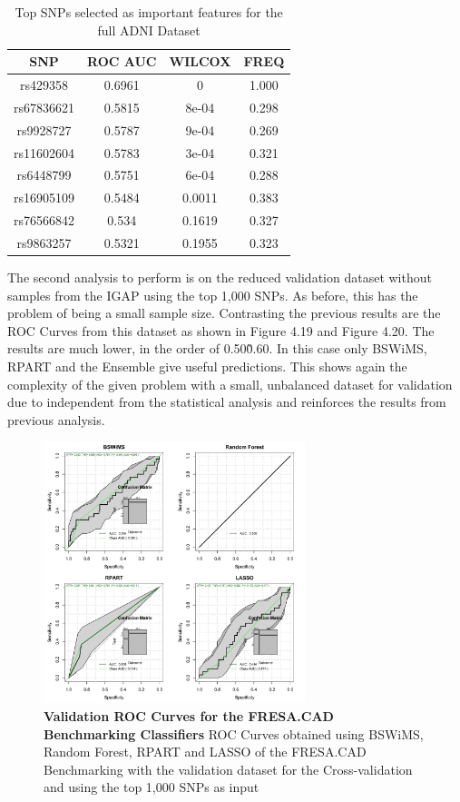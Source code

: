 \begin{table}[ht!]
    \begin{center}
        \begin{tabular}{|c|c|c|c|}
        \hline
        \textbf{SNP}   &  \textbf{ROC AUC} &  \textbf{WILCOX} &  \textbf{FREQ} \\ \hline
rs429358   &	0.6961 &	0       &	1.000 \\ \hline
rs67836621  &	0.5815 &	8e-04   &	0.298 \\ \hline
rs9928727	&	0.5787 &	9e-04   &	0.269 \\ \hline
rs11602604	&	0.5783 &	3e-04   &	0.321 \\ \hline
rs6448799	&	0.5751 &	6e-04   &	0.288 \\ \hline
rs16905109	&	0.5484 &	0.0011  &	0.383 \\ \hline
rs76566842	&	0.534  &	0.1619  &	0.327 \\ \hline
rs9863257	&	0.5321 &	0.1955  &	0.323 \\ \hline
        \end{tabular}
    \end{center}
  \caption{Top SNPs selected as important features for the full ADNI Dataset}
  \label{topsnps}
\end{table}

\newpage
The second analysis to perform is on the reduced validation dataset without samples from the IGAP using the top 1,000 SNPs. As before, this has the problem of being a small sample size. Contrasting the previous results are the ROC Curves from this dataset as shown in Figure 4.19 and Figure 4.20. The results are much lower, in the order of 0.50\~0.60. In this case only BSWiMS, RPART and the Ensemble give useful predictions. This shows again the complexity of the given problem with a small, unbalanced dataset for validation due to independent from the statistical analysis and reinforces the results from previous analysis.

 \begin{figure}[!ht]
\centerline{\includegraphics[width=3in]{images/results/fresaCurves1Val.png}}
\caption{{\bf Validation ROC Curves for the FRESA.CAD Benchmarking Classifiers} 
ROC Curves obtained using BSWiMS, Random Forest, RPART and LASSO of the FRESA.CAD Benchmarking with the validation dataset for the Cross-validation and using the top 1,000 SNPs as input}
\label{fig24}
\end{figure}

